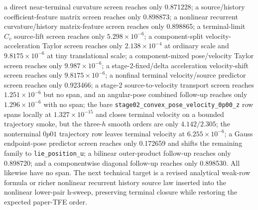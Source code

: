 \documentclass[11pt]{article}
\newcommand{\tfe}{TFE}
\begin{document}
a direct near-terminal curvature screen reaches only 0.871228;
a source/history coefficient-feature matrix screen reaches only 0.898873;
a nonlinear recurrent curvature/history matrix-feature screen reaches only
0.898865;
a terminal-limit $C_v$ source-lift screen reaches only $5.298\times10^{-6}$;
a component-split velocity-acceleration Taylor screen reaches only
$2.138\times10^{-4}$ at ordinary scale and $9.8175\times10^{-6}$ at tiny
translational scale;
a component-mixed pose/velocity Taylor screen reaches only
$9.987\times10^{-6}$;
a stage-2-fixed/delta acceleration velocity-shift screen reaches only
$9.8175\times10^{-6}$;
a nonfinal terminal velocity/source predictor screen reaches only 0.923466;
a stage-2 source-to-velocity transport screen reaches $1.251\times10^{-6}$ but
no span, and an angular-pose combined follow-up reaches only
$1.296\times10^{-6}$ with no span; the bare
\nolinkurl{stage02_convex_pose_velocity_0p00_z} row spans locally at
$1.327\times10^{-15}$ and closes terminal velocity on a bounded trajectory
smoke, but the three-$h$ smooth orders are only $4.142/2.305$; the nonterminal
$0p01$ trajectory row leaves terminal velocity at $6.255\times10^{-6}$;
a Gauss endpoint-pose predictor screen reaches only 0.172659 and shifts the
remaining family to \nolinkurl{lie_position_u};
a bilinear
outer-product follow-up reaches only 0.898720; and a componentwise diagonal
follow-up reaches only 0.898530.  All likewise have no span.  The next
technical target is a revised analytical weak-row formula or richer nonlinear
recurrent history source law inserted into the nonlinear lower-pair h-sweep,
preserving terminal closure while restoring the expected paper-\tfe{} order.
\end{document}

